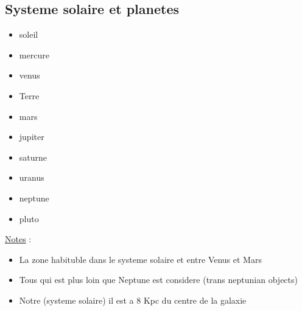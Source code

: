 \documentclass[12pt]{book}
\begin{document}
        \subsection{Systeme solaire et planetes}
            \begin{itemize}
                \item soleil
                \item mercure
                \item venus
                \item Terre
                \item mars
                \item jupiter
                \item saturne 
                \item uranus
                \item neptune
                \item pluto
            \end{itemize}
            \underline{Notes} :
            \begin{itemize}
                \item La zone habituble dans le systeme solaire et entre Venus et Mars 
                \item Tous qui est plus loin que Neptune est considere (trans neptunian objects)
                \item Notre (systeme solaire) il est a 8 Kpc du centre de la galaxie
            \end{itemize}
\end{document}
